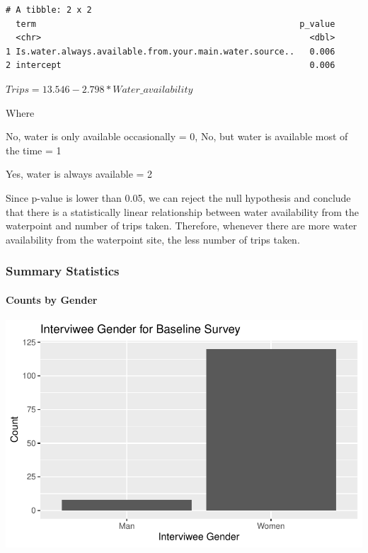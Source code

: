 \documentclass[
  letterpaper,
  DIV=11,
  numbers=noendperiod]{scrartcl}
\let\oldparagraph\paragraph
\renewcommand{\paragraph}[1]{\oldparagraph{#1}\mbox{}}
\begin{document}
\begin{verbatim}
# A tibble: 2 x 2
  term                                                    p_value
  <chr>                                                     <dbl>
1 Is.water.always.available.from.your.main.water.source..   0.006
2 intercept                                                 0.006
\end{verbatim}

\(Trips = 13.546 - 2.798*Water\_availability\)

Where

No, water is only available occasionally = 0, No, but water is available
most of the time = 1

Yes, water is always available = 2

Since p-value is lower than 0.05, we can reject the null hypothesis and
conclude that there is a statistically linear relationship between water
availability from the waterpoint and number of trips taken. Therefore,
whenever there are more water availability from the waterpoint site, the
less number of trips taken.

\hypertarget{summary-statistics}{%
\subsubsection{Summary Statistics}\label{summary-statistics}}

\hypertarget{counts-by-gender}{%
\paragraph{Counts by Gender}\label{counts-by-gender}}

\includegraphics{report_files/figure-pdf/unnamed-chunk-16-1.pdf}
\end{document}
